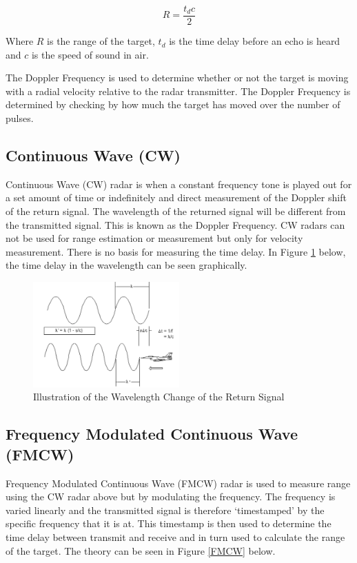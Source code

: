 \begin{equation}
    R = \frac{t_d c}{2}
\end{equation}{}

Where $R$ is the range of the target, $t_d$ is the time delay before an echo is heard and $c$ is the speed of sound in air.

The Doppler Frequency is used to determine whether or not the target is moving with a radial velocity relative to the radar transmitter. The Doppler Frequency is determined by checking by how much the target has moved over the number of pulses.


\subsection{Continuous Wave (CW)}
Continuous Wave (CW) radar is when a constant frequency tone is played out for a set amount of time or indefinitely and direct measurement of the Doppler shift of the return signal. The wavelength of the returned signal will be different from the transmitted signal. This is known as the Doppler Frequency. CW radars can not be used for range estimation or measurement but only for velocity measurement. There is no basis for measuring the time delay. In Figure \ref{Wavelength} below, the time delay in the wavelength can be seen graphically. \cite{noauthor_continuous_2019}

\begin{figure}[h!]
    \centering
    \includegraphics[width = 0.5\textwidth]{images/CW.pdf}
    \caption{Illustration of the Wavelength Change of the Return Signal}\label{Wavelength}
\end{figure}

\subsection{Frequency Modulated Continuous Wave (FMCW)}
Frequency Modulated Continuous Wave (FMCW) radar is used to measure range using the CW radar above but by modulating the frequency. The frequency is varied linearly and the transmitted signal is therefore ‘timestamped’ by the specific frequency that it is at. This timestamp is then used to determine the time delay between transmit and receive and in turn used to calculate the range of the target. The theory can be seen in Figure \ref{FMCW} below. \cite{noauthor_continuous_2019}

